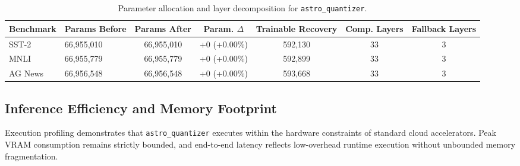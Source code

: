 \begin{table}[t]
\centering
\small
\begin{tabular}{llccccc}
\toprule
\textbf{Benchmark} & \textbf{Params Before} & \textbf{Params After} & \textbf{Param. $\Delta$} & \textbf{Trainable Recovery} & \textbf{Comp. Layers} & \textbf{Fallback Layers} \\
\midrule
SST-2 & 66,955,010 & 66,955,010 & +0 (+0.00\%) & 592,130 & 33 & 3 \\
MNLI & 66,955,779 & 66,955,779 & +0 (+0.00\%) & 592,899 & 33 & 3 \\
AG News & 66,956,548 & 66,956,548 & +0 (+0.00\%) & 593,668 & 33 & 3 \\
\bottomrule
\end{tabular}
\caption{Parameter allocation and layer decomposition for \texttt{astro\_quantizer}.}
\label{tab:params_astro_quantizer}
\end{table}

\subsection{Inference Efficiency and Memory Footprint}
Execution profiling demonstrates that \texttt{astro\_quantizer} executes within the hardware constraints of standard cloud accelerators. Peak VRAM consumption remains strictly bounded, and end-to-end latency reflects low-overhead runtime execution without unbounded memory fragmentation.
